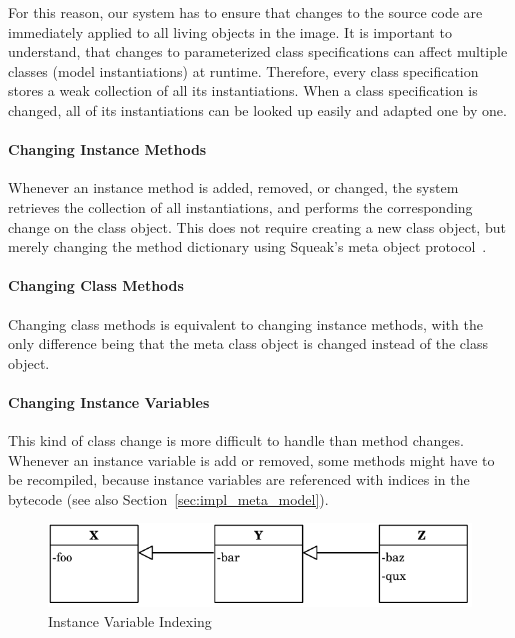 For this reason, our system has to ensure that changes to the source code are immediately applied to all living objects in the image. It is important to understand, that changes to parameterized class specifications can affect multiple classes (model instantiations) at runtime. Therefore, every class specification stores a weak collection of all its instantiations. When a class specification is changed, all of its instantiations can be looked up easily and adapted one by one.

\paragraph{Changing Instance Methods}
Whenever an instance method is added, removed, or changed, the system retrieves the collection of all instantiations, and performs the corresponding change on the class object. This does not require creating a new class object, but merely changing the method dictionary using Squeak's meta object protocol~\cite{Goldberg:1983:SLI:273, Kiczales:1991:AMP:574212}.

\paragraph{Changing Class Methods}
Changing class methods is equivalent to changing instance methods, with the only difference being that the meta class object is changed instead of the class object.

\paragraph{Changing Instance Variables}
This kind of class change is more difficult to handle than method changes. Whenever an instance variable is add or removed, some methods might have to be recompiled, because instance variables are referenced with indices in the bytecode (see also Section~\ref{sec:impl_meta_model}). 

\begin{figure}[!htp]
	\centering
	\includegraphics[scale=1]{inst_vars.pdf}
	\caption{Instance Variable Indexing}
	\label{fig:impl_inst_vars}
\end{figure}

